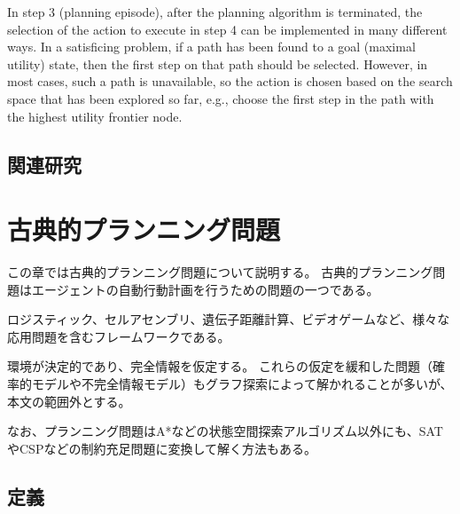 \documentclass{report}
\begin{document}
In step 3 (planning episode), after the planning algorithm is terminated, the selection of the action to execute in step 4 can be implemented in many different ways.
In a satisficing problem, if a path has been found to a goal (maximal utility) state, then the first step on that path should be selected. However, in most cases, such a path is unavailable, so the action is chosen based on the search space that has been explored so far, e.g., choose the first step in the path with the highest utility frontier node.

\section{関連研究}

\chapter{古典的プランニング問題}
\label{ch:classical-planning}
この章では古典的プランニング問題について説明する。
古典的プランニング問題はエージェントの自動行動計画を行うための問題の一つである\cite{}。

ロジスティック\cite{helmert2010scanalyzer,sousa2013toward}、セルアセンブリ\cite{asai2014fully}、遺伝子距離計算\cite{erdem2005genome}、ビデオゲーム\cite{Lipovetzky2015a}など、様々な応用問題を含むフレームワークである。

環境が決定的であり、完全情報を仮定する。
これらの仮定を緩和した問題（確率的モデルや不完全情報モデル）もグラフ探索によって解かれることが多いが、本文の範囲外とする\cite{}。

なお、プランニング問題はA*などの状態空間探索アルゴリズム以外にも、SATやCSPなどの制約充足問題に変換して解く方法もある\cite{}。

\section{定義}
\end{document}

